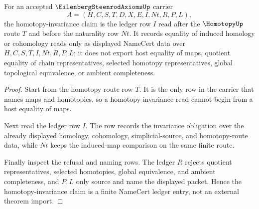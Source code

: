 \begin{theorem}
\label{thm:eilenberg-steenrod-homotopy-invariance-ledger}
For an accepted $\EilenbergSteenrodAxiomsUp$ carrier
$$
A=(H,C,S,T,D,X,E,I,Nt,R,P,L),
$$
the homotopy-invariance claim is the ledger row $I$ read after the $\HomotopyUp$ route $T$ and before the naturality row $Nt$. It records equality of induced homology or cohomology reads only as displayed NameCert data over $H,C,S,T,I,Nt,R,P,L$; it does not export host equality of maps, quotient equality of chain representatives, selected homotopy representatives, global topological equivalence, or ambient completeness.
\end{theorem}
\begin{proof}
Start from the homotopy route row $T$. It is the only row in the carrier that names maps and homotopies, so a homotopy-invariance read cannot begin from a host equality of maps.

Next read the ledger row $I$. The row records the invariance obligation over the already displayed homology, cohomology, simplicial-source, and homotopy-route data, while $Nt$ keeps the induced-map comparison on the same finite route.

Finally inspect the refusal and naming rows. The ledger $R$ rejects quotient representatives, selected homotopies, global equivalence, and ambient completeness, and $P,L$ only source and name the displayed packet. Hence the homotopy-invariance claim is a finite NameCert ledger entry, not an external theorem import.
\end{proof}




